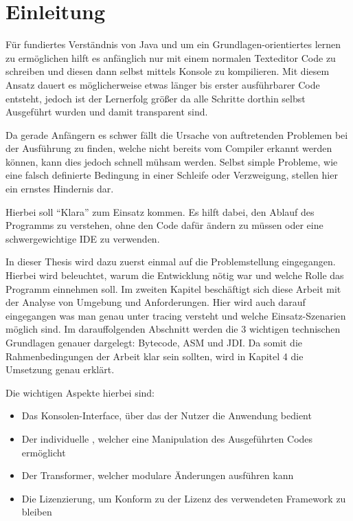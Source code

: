 
\chapter{Einleitung}

Für fundiertes Verständnis von Java und um ein Grundlagen-orientiertes lernen zu ermöglichen hilft es anfänglich nur mit einem normalen Texteditor Code zu schreiben und diesen dann selbst mittels Konsole zu kompilieren.
Mit diesem Ansatz dauert es möglicherweise etwas länger bis erster ausführbarer Code entsteht, jedoch ist der Lernerfolg größer da alle Schritte dorthin selbst Ausgeführt wurden und damit transparent sind.

Da gerade Anfängern es schwer fällt die Ursache von auftretenden Problemen bei der Ausführung zu finden, welche nicht bereits vom Compiler erkannt werden können, kann dies jedoch schnell mühsam werden. Selbst simple Probleme, wie eine falsch definierte Bedingung in einer Schleife oder Verzweigung, stellen hier ein ernstes Hindernis dar.

Hierbei soll "`Klara"' zum Einsatz kommen. Es hilft dabei, den Ablauf des Programms zu verstehen, ohne den Code dafür ändern zu müssen oder eine schwergewichtige \ac{IDE} zu verwenden.

In dieser Thesis wird dazu zuerst einmal auf die Problemstellung eingegangen. Hierbei wird beleuchtet, warum die Entwicklung nötig war und welche Rolle das Programm einnehmen soll.
Im zweiten Kapitel beschäftigt sich diese Arbeit mit der Analyse von Umgebung und Anforderungen. Hier wird auch darauf eingegangen was man genau unter tracing versteht und welche Einsatz-Szenarien möglich sind.
Im darauffolgenden Abschnitt werden die 3 wichtigen technischen Grundlagen genauer dargelegt: Bytecode, ASM und \ac{JDI}.
Da somit die Rahmenbedingungen der Arbeit klar sein sollten, wird in Kapitel 4 die Umsetzung genau erklärt.

Die wichtigen Aspekte hierbei sind:
\begin{itemize}
	\item Das Konsolen-Interface, über das der Nutzer die Anwendung bedient
	\item Der individuelle , welcher eine Manipulation des Ausgeführten Codes ermöglicht
	\item Der Transformer, welcher modulare Änderungen ausführen kann
	\item Die Lizenzierung, um Konform zu der Lizenz des verwendeten Framework zu bleiben
\end{itemize}

